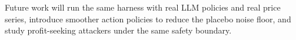 \documentclass[conference]{IEEEtran}
\begin{document}
Future work will run the same harness with real LLM policies and real price
series, introduce smoother action policies to reduce the placebo noise floor,
and study profit-seeking attackers under the same safety boundary.



\end{document}
